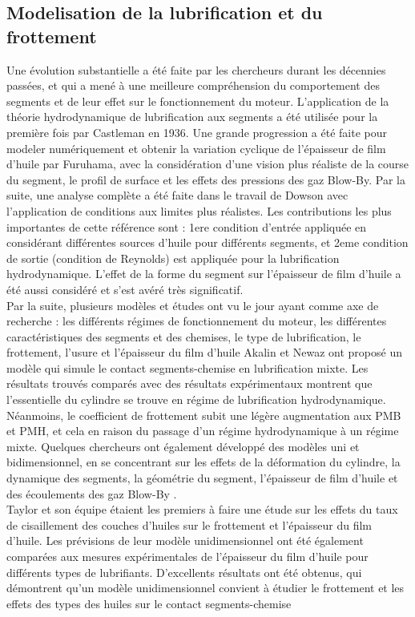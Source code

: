 \subsection{Modelisation de la lubrification et du frottement}
Une évolution substantielle a été faite par les chercheurs durant les décennies passées, et qui a mené à une meilleure compréhension du comportement des segments et de leur effet sur le fonctionnement du moteur. L’application de la théorie hydrodynamique de lubrification aux segments a été utilisée pour la première fois par Castleman en 1936\cite{stephen}. Une grande progression a été faite pour modeler numériquement et obtenir la variation cyclique de l'épaisseur de film d'huile par Furuhama\cite{ayad2}, avec la considération d’une vision plus réaliste de la course du segment, le profil de surface et les effets des pressions des gaz Blow-By. Par la suite, une analyse complète a été faite dans le travail de Dowson avec l'application de conditions aux limites plus réalistes. Les contributions les plus importantes de cette référence sont : 1ere condition d’entrée appliquée en considérant différentes sources d'huile pour différents segments, et 2eme condition de sortie (condition de Reynolds) est appliquée pour la lubrification hydrodynamique. L'effet de la forme du segment sur l'épaisseur de film d'huile a été aussi considéré et s'est avéré très significatif.\\

Par la suite, plusieurs modèles et études ont vu le jour ayant comme axe de recherche : les différents régimes de fonctionnement du moteur, les différentes caractéristiques des segments et des chemises, le type de lubrification, le frottement, l’usure et l’épaisseur du film d'huile Akalin et Newaz ont proposé un modèle qui simule le contact segments-chemise en lubrification mixte. Les résultats trouvés comparés avec des résultats expérimentaux montrent que l’essentielle du cylindre se trouve en régime de lubrification hydrodynamique. Néanmoins, le coefficient de frottement subit une légère augmentation aux PMB et PMH, et cela en raison du passage d’un régime hydrodynamique à un régime mixte. Quelques chercheurs ont également développé des modèles uni et bidimensionnel, en se concentrant sur les effets de la déformation du cylindre, la dynamique des segments, la géométrie du segment, l'épaisseur de film d'huile et des écoulements des gaz Blow-By \cite{Amal}\cite{Arup}\cite{ayad1}.\\

Taylor et son équipe étaient les premiers à faire une étude sur les effets du taux de cisaillement des couches d'huiles sur le frottement et l'épaisseur du film d'huile. Les prévisions de leur modèle unidimensionnel ont été également comparées aux mesures expérimentales de l'épaisseur du film d'huile pour différents types de lubrifiants. D'excellents résultats ont été obtenus, qui démontrent qu’un modèle unidimensionnel convient à étudier le frottement et les effets des types des huiles sur le contact segments-chemise\\


